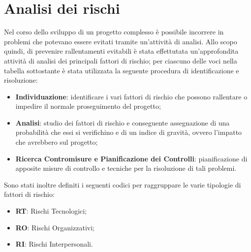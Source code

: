 \section{Analisi dei rischi}

Nel corso dello sviluppo di un progetto complesso è possibile incorrere in 
problemi che potevano essere evitati tramite un'attività di analisi. Allo scopo 
quindi, di prevenire rallentamenti evitabili è stata effettutata 
un'approfondita attività di analisi dei principali fattori di rischio; per 
ciascuno delle voci nella tabella sottostante è stata utilizzata la seguente 
procedura di identificazione e risoluzione:

\begin{itemize}
	\item \textbf{Individuazione}: identificare i vari fattori di rischio che possono rallentare o impedire il normale proseguimento del progetto;
	\item \textbf{Analisi}: studio dei fattori di rischio e conseguente assegnazione di una probabilità che essi si verifichino e di un indice di gravità, ovvero l'impatto che avrebbero sul progetto;
	\item \textbf{Ricerca Contromisure e Pianificazione dei Controlli}: pianificazione di apposite misure di controllo e tecniche per la risoluzione di tali problemi.
\end{itemize}

Sono stati inoltre definiti i seguenti codici per raggruppare le varie 
tipologie di fattori di rischio:

\begin{itemize}
	\item \textbf{RT}: Rischi Tecnologici;
	\item \textbf{RO}: Rischi Organizzativi;
	\item \textbf{RI}: Rischi Interpersonali.
\end{itemize}

